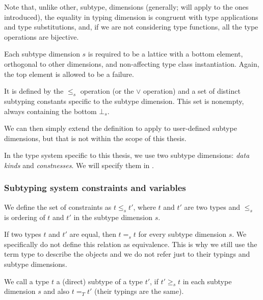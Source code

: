 \begin{remark}
    Note that, unlike other, subtype, dimensions (generally; will apply to the ones introduced), the equality in typing dimension is congruent with type applications and type substitutions, and, if we are not considering type functions, all the type operations are bijective.
\end{remark}

\begin{defn}
    Each subtype dimension $s$ is required to be a lattice with a bottom element, orthogonal to other dimensions, and non-affecting type class instantiation. Again, the top element is allowed to be a failure.

    It is defined by the $\leq_s$ operation (or the $\lor$ operation) and a set of distinct subtyping constants specific to the subtype dimension. This set is nonempty, always containing the bottom $\bot_s$.

    We can then simply extend the definition to apply to user-defined subtype dimensions, but that is not within the scope of this thesis.

    In the type system specific to this thesis, we use two subtype dimensions: \emph{data kinds} and \emph{constnesses}. We will specify them in .
\end{defn}


\subsubsection{Subtyping system constraints and variables}

\begin{defn}
    We define the set of constraints as $t \leq_s t'$, where $t$ and $t'$ are two types and $\leq_s$ is ordering of $t$ and $t'$ in the subtype dimension $s$.
\end{defn}

\begin{defn}
    If two types $t$ and $t'$ are equal, then $t =_s t$ for every subtype dimension $s$. We specifically do not define this relation as equivalence. This is why we still use the term type to describe the objects and we do not refer just to their typings and subtype dimensions.
\end{defn}

\begin{defn}
    We call a type $t$ a (direct) subtype of a type $t'$, if $t' \geq_s t$ in each subtype dimension $s$ and also $t =_T t'$ (their typings are the same).
\end{defn}

